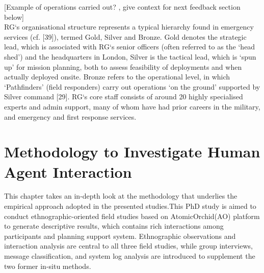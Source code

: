[Example of operations carried out? , give context for next feedback section below]\\

RG`s organisational structure represents a typical hierarchy found in emergency services (cf. [39]), termed Gold, Silver and Bronze. Gold denotes the strategic lead, which is associated with RG`s senior officers (often referred to as the `head shed') and the headquarters in London, Silver is the tactical lead, which is `spun up' for mission planning, both to assess feasibility of deployments and when actually deployed onsite. Bronze refers to the operational level, in which `Pathfinders' (field responders) carry out operations `on the ground' supported by Silver command [29]. RG`s core staff consists of around 20 highly specialised experts and admin support, many of whom have had prior careers in the military, and emergency and first response services.\\






\chapter{Methodology to Investigate Human Agent Interaction}\label{ch:methodology}
This chapter takes an in-depth look at the methodology that underlies the empirical approach adopted in the presented studies.This PhD study is aimed to conduct ethnographic-oriented field studies based on AtomicOrchid(AO) platform to generate descriptive results, which contains rich interactions among participants and planning support system. Ethnographic observations and interaction analysis are central to all three field studies, while group interviews, message classification, and system log analysis are introduced to supplement the two former in-situ methods.\\

